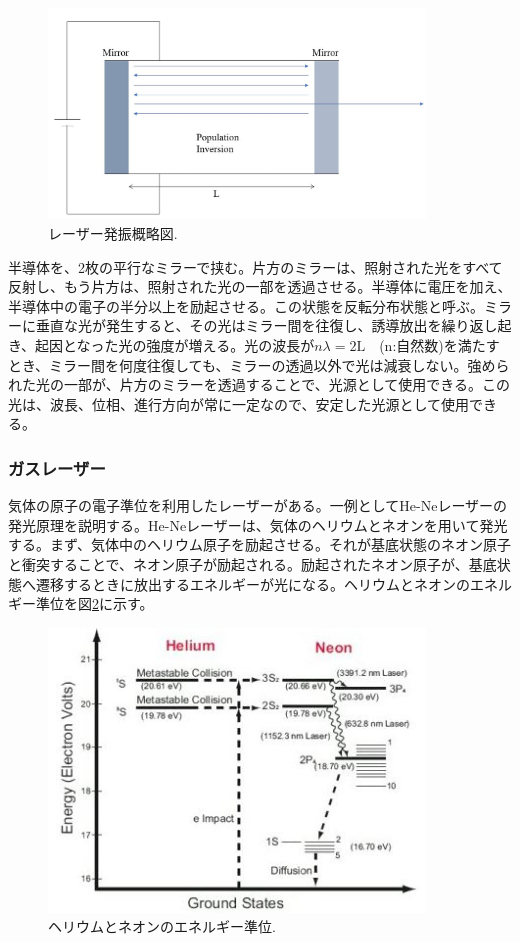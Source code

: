 \documentclass[11pt,a4j]{jsarticle}
\begin{document}
\begin{figure}[h]
 \centering
 \includegraphics[clip,width=10cm]{start_semi_laser.jpg}
 \caption{レーザー発振概略図.}
 \label{fig_laser1}
\end{figure}

\newpage
半導体を、2枚の平行なミラーで挟む。片方のミラーは、照射された光をすべて反射し、もう片方は、照射された光の一部を透過させる。半導体に電圧を加え、半導体中の電子の半分以上を励起させる。この状態を反転分布状態と呼ぶ。ミラーに垂直な光が発生すると、その光はミラー間を往復し、誘導放出を繰り返し起き、起因となった光の強度が増える。光の波長が$n\lambda=2\mathrm{L}$　(n:自然数)を満たすとき、ミラー間を何度往復しても、ミラーの透過以外で光は減衰しない。強められた光の一部が、片方のミラーを透過することで、光源として使用できる。この光は、波長、位相、進行方向が常に一定なので、安定した光源として使用できる。

\newpage

\newpage
\subsubsection{ガスレーザー}
気体の原子の電子準位を利用したレーザーがある。一例としてHe-Neレーザーの発光原理を説明する。He-Neレーザーは、気体のヘリウムとネオンを用いて発光する。まず、気体中のヘリウム原子を励起させる。それが基底状態のネオン原子と衝突することで、ネオン原子が励起される。励起されたネオン原子が、基底状態へ遷移するときに放出するエネルギーが光になる。ヘリウムとネオンのエネルギー準位を図\ref{fig_laser2}に示す\cite{HeNe}。

\begin{figure}[h]
 \centering
 \includegraphics[clip,width=10cm]{start_gas_laser.jpg}
 \caption{ヘリウムとネオンのエネルギー準位.}
 \label{fig_laser2}
\end{figure}
\end{document}
